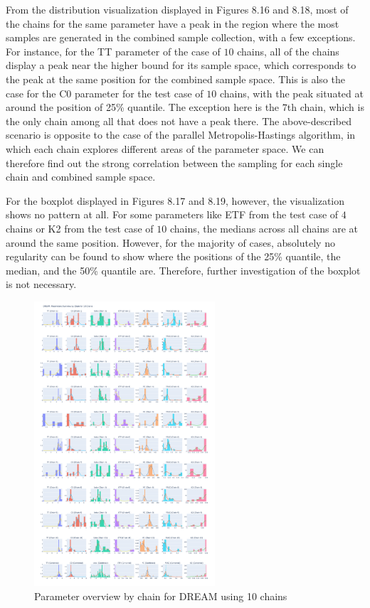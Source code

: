 From the distribution visualization displayed in Figures 8.16 and 8.18, most of the chains for the same parameter have a peak in the region where the most samples are generated in the combined sample collection, with a few exceptions. For instance, for the TT parameter of the case of $10$ chains, all of the chains display a peak near the higher bound for its sample space, which corresponds to the peak at the same position for the combined sample space. This is also the case for the C0 parameter for the test case of $10$ chains, with the peak situated at around the position of 25\% quantile. The exception here is the $7$th chain, which is the only chain among all that does not have a peak there. The above-described scenario is opposite to the case of the parallel Metropolis-Hastings algorithm, in which each chain explores different areas of the parameter space. We can therefore find out the strong correlation between the sampling for each single chain and combined sample space.

For the boxplot displayed in Figures 8.17 and 8.19, however, the visualization shows no pattern at all. For some parameters like ETF from the test case of $4$ chains or K2 from the test case of $10$ chains, the medians across all chains are at around the same position. However, for the majority of cases, absolutely no regularity can be found to show where the positions of the 25\% quantile, the median, and the 50\% quantile are. Therefore, further investigation of the boxplot is not necessary.

\begin{figure}[H]
    \centering
    \includegraphics[width=0.6\textwidth]{figures/dream/param_overview_10.png}
    \captionsetup{width=.8\textwidth}
    \caption{Parameter overview by chain for DREAM using 10 chains}
    \label{fig:enter-label}
\end{figure}

